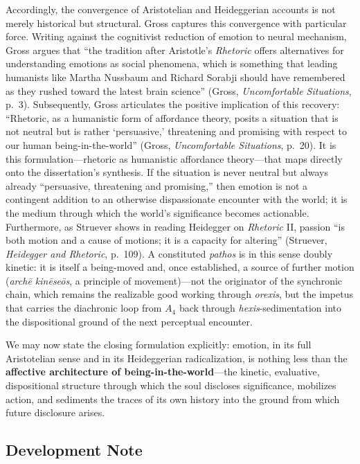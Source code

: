 Accordingly, the convergence of Aristotelian and Heideggerian accounts is not merely historical but structural. Gross captures this convergence with particular force. Writing against the cognitivist reduction of emotion to neural mechanism, Gross argues that ``the tradition after Aristotle's \textit{Rhetoric} offers alternatives for understanding emotions as social phenomena, which is something that leading humanists like Martha Nussbaum and Richard Sorabji should have remembered as they rushed toward the latest brain science'' (Gross, \textit{Uncomfortable Situations}, p.~3). Subsequently, Gross articulates the positive implication of this recovery: ``Rhetoric, as a humanistic form of affordance theory, posits a situation that is not neutral but is rather `persuasive,' threatening and promising with respect to our human being-in-the-world'' (Gross, \textit{Uncomfortable Situations}, p.~20). It is this formulation---rhetoric as humanistic affordance theory---that maps directly onto the dissertation's synthesis. If the situation is never neutral but always already ``persuasive, threatening and promising,'' then emotion is not a contingent addition to an otherwise dispassionate encounter with the world; it is the medium through which the world's significance becomes actionable. Furthermore, as Struever shows in reading Heidegger on \textit{Rhetoric} II, passion ``is both motion and a cause of motions; it is a capacity for altering'' (Struever, \textit{Heidegger and Rhetoric}, p.~109). A constituted \textit{pathos} is in this sense doubly kinetic: it is itself a being-moved and, once established, a source of further motion (\textit{archē kinēseōs}, a principle of movement)---not the originator of the synchronic chain, which remains the realizable good working through \textit{orexis}, but the impetus that carries the diachronic loop from $A_4$ back through \textit{hexis}-sedimentation into the dispositional ground of the next perceptual encounter.

We may now state the closing formulation explicitly: emotion, in its full Aristotelian sense and in its Heideggerian radicalization, is nothing less than the \textbf{affective architecture of being-in-the-world}---the kinetic, evaluative, dispositional structure through which the soul discloses significance, mobilizes action, and sediments the traces of its own history into the ground from which future disclosure arises.


\subsection*{Development Note}

